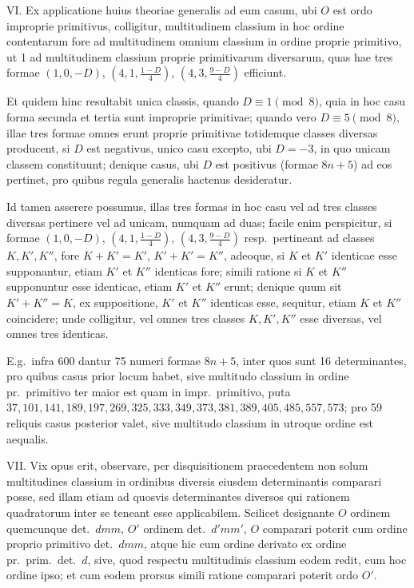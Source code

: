 \documentclass[12pt,a4paper]{article}
\theoremstyle{plain}
\theoremstyle{definition}
\theoremstyle{remark}
\theoremstyle{problemstyle}
\begin{document}
VI. Ex applicatione huius theoriae generalis ad eum casum, ubi $O$ est ordo improprie primitivus, colligitur, multitudinem classium in hoc ordine contentarum fore ad multitudinem omnium classium in ordine proprie primitivo, ut 1 ad multitudinem classium proprie primitivarum diversarum, quas hae tres formae $(1, 0, -D)$, $(4, 1, \frac{1 - D}{4})$, $(4, 3, \frac{9 - D}{4})$ efficiunt.

Et quidem hinc resultabit unica classis, quando $D \equiv 1 \pmod{8}$, quia in hoc casu forma secunda et tertia sunt improprie primitivae; quando vero $D \equiv 5 \pmod{8}$, illae tres formae omnes erunt proprie primitivae totidemque classes diversas producent, si $D$ est negativus, unico casu excepto, ubi $D = -3$, in quo unicam classem constituunt; denique casus, ubi $D$ est positivus (formae $8n + 5$) ad eos pertinet, pro quibus regula generalis hactenus desideratur.

Id tamen asserere possumus, illas tres formas in hoc casu vel ad tres classes diversas pertinere vel ad unicam, numquam ad duas; facile enim perspicitur, si formae $(1, 0, -D)$, $(4, 1, \frac{1 - D}{4})$, $(4, 3, \frac{9 - D}{4})$ resp.\ pertineant ad classes $K, K', K''$, fore $K + K' = K'$, $K' + K' = K''$, adeoque, si $K$ et $K'$ identicae esse supponantur, etiam $K'$ et $K''$ identicas fore; simili ratione si $K$ et $K''$ supponuntur esse identicae, etiam $K'$ et $K''$ erunt; denique quum sit $K' + K'' = K$, ex suppositione, $K'$ et $K''$ identicas esse, sequitur, etiam $K$ et $K''$ coincidere; unde colligitur, vel omnes tres classes $K, K', K''$ esse diversas, vel omnes tres identicas.

E.g.\ infra 600 dantur 75 numeri formae $8n + 5$, inter quos sunt 16 determinantes, pro quibus casus prior locum habet, sive multitudo classium in ordine pr.\ primitivo ter maior est quam in impr.\ primitivo, puta $37, 101, 141, 189, 197, 269, 325, 333, 349, 373, 381, 389, 405, 485, 557, 573$; pro 59 reliquis casus posterior valet, sive multitudo classium in utroque ordine est aequalis.

VII. Vix opus erit, observare, per disquisitionem praecedentem non solum multitudines classium in ordinibus diversis eiusdem determinantis comparari posse, sed illam etiam ad quosvis determinantes diversos qui rationem quadratorum inter se teneant esse applicabilem. Scilicet designante $O$ ordinem quemcunque det.\ $dmm$, $O'$ ordinem det.\ $d'mm'$, $O$ comparari poterit cum ordine proprio primitivo det.\ $dmm$, atque hic cum ordine derivato ex ordine pr.\ prim.\ det.\ $d$, sive, quod respectu multitudinis classium eodem redit, cum hoc ordine ipso; et cum eodem prorsus simili ratione comparari poterit ordo $O'$.
\end{document}
